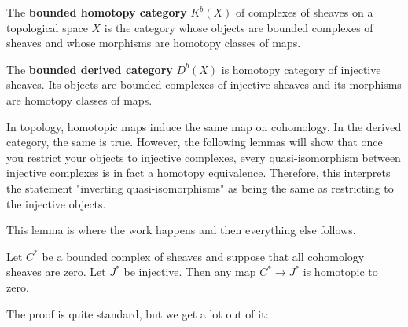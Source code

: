 \documentclass[12pt]{article}
\begin{document}
\begin{definition}

    The \textbf{bounded homotopy category }$K^b(X)$ of complexes of sheaves on a topological space $X$
    is the category whose objects are bounded complexes of sheaves 
    and whose morphisms are homotopy classes of maps.

    \hfill

    The \textbf{bounded derived category} $D^b(X)$ is homotopy category of injective sheaves. Its objects
    are bounded complexes of injective sheaves and its morphisms are homotopy classes of maps.
\end{definition}

\begin{remark}
    In topology, homotopic maps induce the same map on cohomology. In the derived category, the same is true.
    However, the following lemmas will show that once you restrict your objects to injective complexes,
    every quasi-isomorphism between injective complexes is in fact a homotopy equivalence.
    Therefore, this interprets the statement "inverting quasi-isomorphisms" as being the same as 
    restricting to the injective objects.
\end{remark}

This lemma is where the work happens and then everything else follows.
\begin{lemma}
    Let $C^*$ be a bounded complex of sheaves and suppose that all cohomology sheaves are zero. 
    Let $J^*$ be injective. Then any map $C^*\to J^*$ is homotopic to zero.
\end{lemma}
The proof is quite standard, but we get a lot out of it: 
\end{document}
